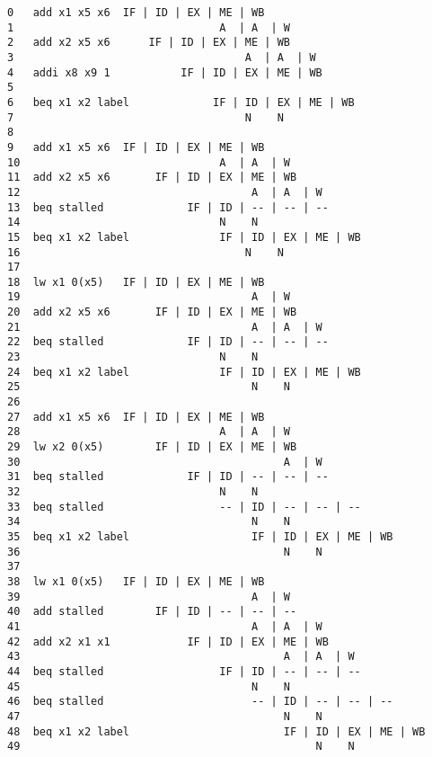 \documentclass[varwidth, convert]{standalone}
\begin{document}
  \begin{BVerbatim}[]
0   add x1 x5 x6  IF | ID | EX | ME | WB
1                                A  | A  | W
2   add x2 x5 x6      IF | ID | EX | ME | WB
3                                    A  | A  | W
4   addi x8 x9 1           IF | ID | EX | ME | WB
5
6   beq x1 x2 label             IF | ID | EX | ME | WB
7                                    N    N
8
9   add x1 x5 x6  IF | ID | EX | ME | WB
10                               A  | A  | W
11  add x2 x5 x6       IF | ID | EX | ME | WB
12                                    A  | A  | W
13  beq stalled             IF | ID | -- | -- | --
14                               N    N
15  beq x1 x2 label              IF | ID | EX | ME | WB
16                                   N    N
17
18  lw x1 0(x5)   IF | ID | EX | ME | WB
19                                    A  | W
20  add x2 x5 x6       IF | ID | EX | ME | WB
21                                    A  | A  | W
22  beq stalled             IF | ID | -- | -- | --
23                               N    N
24  beq x1 x2 label              IF | ID | EX | ME | WB
25                                    N    N
26
27  add x1 x5 x6  IF | ID | EX | ME | WB
28                               A  | A  | W
29  lw x2 0(x5)        IF | ID | EX | ME | WB
30                                         A  | W
31  beq stalled             IF | ID | -- | -- | --
32                               N    N
33  beq stalled                  -- | ID | -- | -- | --
34                                    N    N
35  beq x1 x2 label                   IF | ID | EX | ME | WB
36                                         N    N
37
38  lw x1 0(x5)   IF | ID | EX | ME | WB
39                                    A  | W
40  add stalled        IF | ID | -- | -- | --
41                                    A  | A  | W
42  add x2 x1 x1            IF | ID | EX | ME | WB
43                                         A  | A  | W
44  beq stalled                  IF | ID | -- | -- | --
45                                    N    N
46  beq stalled                       -- | ID | -- | -- | --
47                                         N    N
48  beq x1 x2 label                        IF | ID | EX | ME | WB
49                                              N    N
  \end{BVerbatim}
\end{document}
